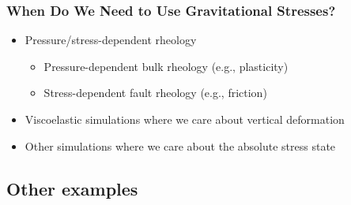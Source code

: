 \documentclass{beamer}
\begin{document}
\begin{frame}
  \frametitle{When Do We Need to Use Gravitational Stresses?}
  \summary{}

  \begin{itemize}
  \item Pressure/stress-dependent rheology
    \begin{itemize}
    \item Pressure-dependent bulk rheology (e.g., plasticity)
    \item Stress-dependent fault rheology (e.g., friction)
    \end{itemize}
  \item Viscoelastic simulations where we care about vertical
    deformation
  \item Other simulations where we care about the absolute stress
    state
  \end{itemize}
  
\end{frame}


\subsection{Other examples}
\end{document}
